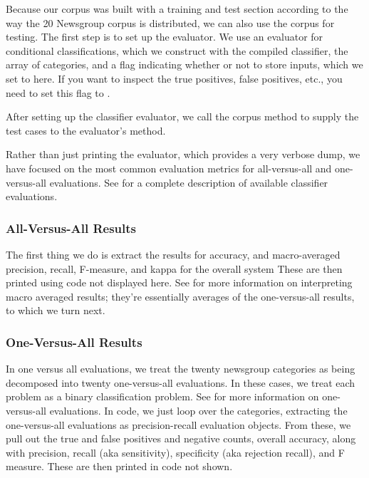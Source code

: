 Because our corpus was built with a training and test section
according to the way the 20 Newsgroup corpus is distributed, we can
also use the corpus for testing.  The first step is to set up the
evaluator.  
%
%
We use an evaluator for conditional classifications, which
we construct with the compiled classifier, the array of categories, and
a flag indicating whether or not to store inputs, which we set to
 here.  If you want to inspect the true positives, false
positives, etc., you need to set this flag to .  

After setting up the classifier evaluator, we call the corpus
method  to supply the test cases to the 
evaluator's  method.  

Rather than just printing the evaluator, which provides a very verbose
dump, we have focused on the most common evaluation metrics for
all-versus-all and one-versus-all evaluations.  See
 for a complete description of
available classifier evaluations.

\subsubsection{All-Versus-All Results}

The first thing we do is extract the results for accuracy,
and macro-averaged precision, recall, F-measure, and kappa
for the overall system
%
%
These are then printed using code not displayed here.  See
 for more information on
interpreting macro averaged results; they're essentially averages
of the one-versus-all results, to which we turn next.


\subsubsection{One-Versus-All Results}

In one versus all evaluations, we treat the twenty newsgroup
categories as being decomposed into twenty one-versus-all evaluations.
In these cases, we treat each problem as a binary classification problem.
See  for more information on
one-versus-all evaluations.  In code, we just loop over the
categories, extracting the one-versus-all evaluations as
precision-recall evaluation objects.
%
%
From these, we pull out the true and false positives and negative
counts, overall accuracy, along with precision, recall (aka sensitivity),
specificity (aka rejection recall), and F measure.  These are then
printed in code not shown.

